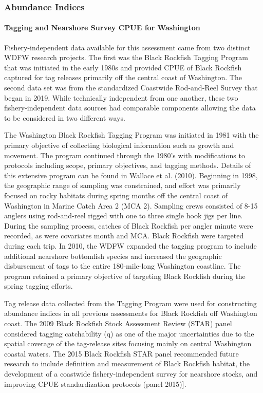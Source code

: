 \documentclass[11pt,
  letterpaper,
]{article}
\begin{document}
\hypertarget{abundance-indices-1}{%
\subsubsection{Abundance Indices}\label{abundance-indices-1}}

\hypertarget{tagging-and-nearshore-survey-cpue-for-washington}{%
\paragraph{Tagging and Nearshore Survey CPUE for Washington}\label{tagging-and-nearshore-survey-cpue-for-washington}}

Fishery-independent data available for this assessment came from two distinct WDFW research projects. The first was the Black Rockfish Tagging Program that was initiated in the early 1980s and provided CPUE of Black Rockfish captured for tag releases primarily off the central coast of Washington. The second data set was from the standardized Coastwide Rod-and-Reel Survey that began in 2019. While technically independent from one another, these two fishery-independent data sources had comparable components allowing the data to be considered in two different ways.

The Washington Black Rockfish Tagging Program was initiated in 1981 with the primary objective of collecting biological information such as growth and movement. The program continued through the 1980's with modifications to protocols including scope, primary objectives, and tagging methods. Details of this extensive program can be found in Wallace et al. (2010). Beginning in 1998, the geographic range of sampling was constrained, and effort was primarily focused on rocky habitats during spring months off the central coast of Washington in Marine Catch Area 2 (MCA 2). Sampling crews consisted of 8-15 anglers using rod-and-reel rigged with one to three single hook jigs per line. During the sampling process, catches of Black Rockfish per angler minute were recorded, as were covariates month and MCA. Black Rockfish were targeted during each trip. In 2010, the WDFW expanded the tagging program to include additional nearshore bottomfish species and increased the geographic disbursement of tags to the entire 180-mile-long Washington coastline. The program retained a primary objective of targeting Black Rockfish during the spring tagging efforts.

Tag release data collected from the Tagging Program were used for constructing abundance indices in all previous assessments for Black Rockfish off Washington coast. The 2009 Black Rockfish Stock Assessment Review (STAR) panel considered tagging catchability (q) as one of the major uncertainties due to the spatial coverage of the tag-release sites focusing mainly on central Washington coastal waters. The 2015 Black Rockfish STAR panel recommended future research to include definition and measurement of Black Rockfish habitat, the development of a coastwide fishery-independent survey for nearshore stocks, and improving CPUE standardization protocols (panel 2015){]}.
\end{document}
